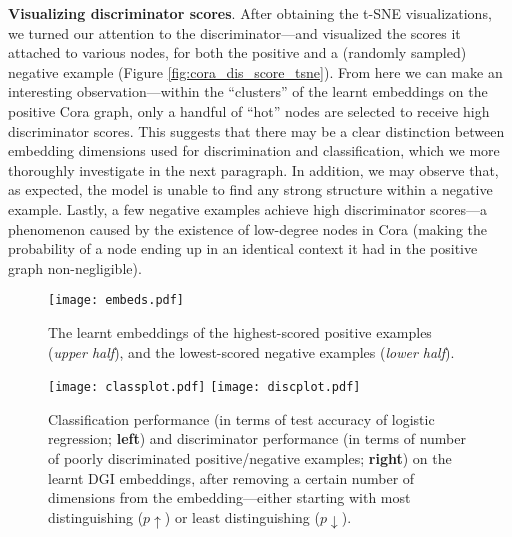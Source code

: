 \documentclass{article} \usepackage{iclr2019_conference,times}
\newcommand{\xhdr}[1]{{\noindent\bfseries #1}.}
\begin{document}
\xhdr{Visualizing discriminator scores} 
After obtaining the t-SNE visualizations, we turned our attention to the discriminator---and visualized the scores it attached to various nodes, for both the positive and a (randomly sampled) negative example (Figure \ref{fig:cora_dis_score_tsne}). From here we can make an interesting observation---within the ``clusters'' of the learnt embeddings on the positive Cora graph, only a handful of ``hot'' nodes are selected to receive high discriminator scores. This suggests that there may be a clear distinction between embedding dimensions used for discrimination and classification, which we more thoroughly investigate in the next paragraph. In addition, we may observe that, as expected, the model is unable to find any strong structure within a negative example. Lastly, a few negative examples achieve high discriminator scores---a phenomenon caused by the existence of low-degree nodes in Cora (making the probability of a node ending up in an identical context it had in the positive graph non-negligible).

\begin{figure}
\centering
  \texttt{[image: embeds.pdf]}
  \caption{The learnt embeddings of the highest-scored positive examples (\emph{upper half}), and the lowest-scored negative examples (\emph{lower half}).}
  \label{fig:embeds}
\end{figure}

\begin{figure}
\centering
\texttt{[image: classplot.pdf]}
\texttt{[image: discplot.pdf]}
\caption{Classification performance (in terms of test accuracy of logistic regression; {\bf left}) and discriminator performance (in terms of number of poorly discriminated positive/negative examples; {\bf right}) on the learnt DGI embeddings, after removing a certain number of dimensions from the embedding---either starting with most distinguishing ($p\uparrow$) or least distinguishing ($p\downarrow$).}
\label{fig:cora_embs}
\end{figure}
\end{document}
